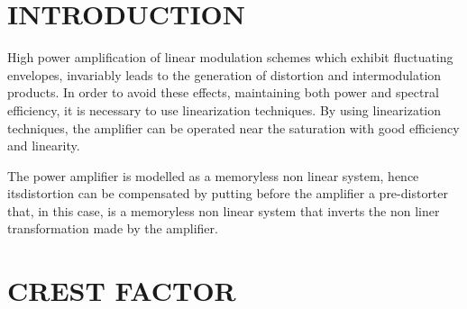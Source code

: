 \documentclass{article}
\begin{document}
\begin{spacing}{1.5}
\section{INTRODUCTION}
High power amplification of linear modulation schemes which exhibit fluctuating envelopes, invariably leads to the generation of distortion and intermodulation products. In order to avoid these effects, maintaining both power and spectral efficiency, it is necessary to use linearization techniques. By using linearization techniques, the amplifier can be operated near the saturation with good efficiency and linearity.

The power amplifier is modelled as a memoryless non linear system, hence itsdistortion can be compensated by putting 
 before the amplifier a pre-distorter that, in this case,
is a memoryless non linear system that inverts the non liner transformation made by the amplifier.

\section{CREST FACTOR}






\end{spacing}
\end{document}
